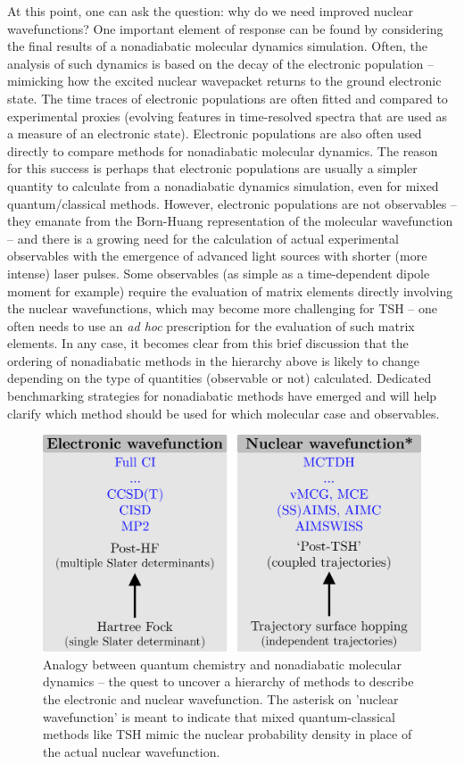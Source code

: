 \documentclass[9pt,bestpractices]{livecoms}
\begin{document}
At this point, one can ask the question: why do we need improved nuclear wavefunctions? One important element of response can be found by considering the final results of a nonadiabatic molecular dynamics simulation. Often, the analysis of such dynamics is based on the decay of the electronic population -- mimicking how the excited nuclear wavepacket returns to the ground electronic state. The time traces of electronic populations are often fitted and compared to experimental proxies (evolving features in time-resolved spectra that are used as a measure of an electronic state). Electronic populations are also often used directly to compare methods for nonadiabatic molecular dynamics. The reason for this success is perhaps that electronic populations are usually a simpler quantity to calculate from a nonadiabatic dynamics simulation, even for mixed quantum/classical methods.\cite{mignolet2018walk} 
However, electronic populations are not observables -- they emanate from the Born-Huang representation of the molecular wavefunction -- and there is a growing need for the calculation of actual experimental observables with the emergence of advanced light sources with shorter (more intense) laser pulses. Some observables (as simple as a time-dependent dipole moment for example) require the evaluation of matrix elements directly involving the nuclear wavefunctions, which may become more challenging for TSH -- one often needs to use an \textit{ad hoc} prescription for the evaluation of such matrix elements. In any case, it becomes clear from this brief discussion that the ordering of nonadiabatic methods in the hierarchy above is likely to change depending on the type of quantities (observable or not) calculated. Dedicated benchmarking strategies for nonadiabatic methods have emerged and will help clarify which method should be used for which molecular case and observables.\cite{doi:10.1021/acs.jpclett.1c00266,ibele2020,cigrang2025roadmapNAMD}


\begin{figure}[h!]
    \centering
    \includegraphics[width=1.0\linewidth]{./figures/hierarchy.png}
    \caption{Analogy between quantum chemistry and nonadiabatic molecular dynamics -- the quest to uncover a hierarchy of methods to describe the electronic and nuclear wavefunction. The asterisk on 'nuclear wavefunction' is meant to indicate that mixed quantum-classical methods like TSH mimic the nuclear probability density in place of the actual nuclear wavefunction.}
    \label{fig:hierarchymethods}
\end{figure}
\end{document}
